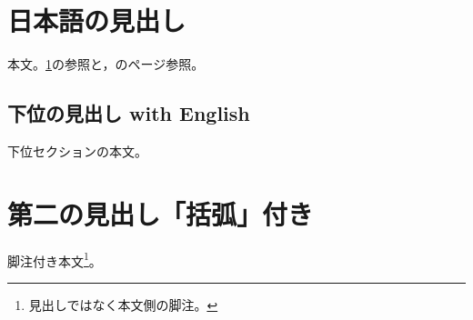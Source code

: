 \documentclass[pdflatex]{jlreq}
\begin{document}
\tableofcontents
\section{日本語の見出し}\label{sec:first}
本文。\ref{sec:first}の参照と，\pageref{sec:first}のページ参照。
\subsection{下位の見出し with English}
下位セクションの本文。
\section{第二の見出し「括弧」付き}
脚注付き本文\footnote{見出しではなく本文側の脚注。}。
\end{document}
